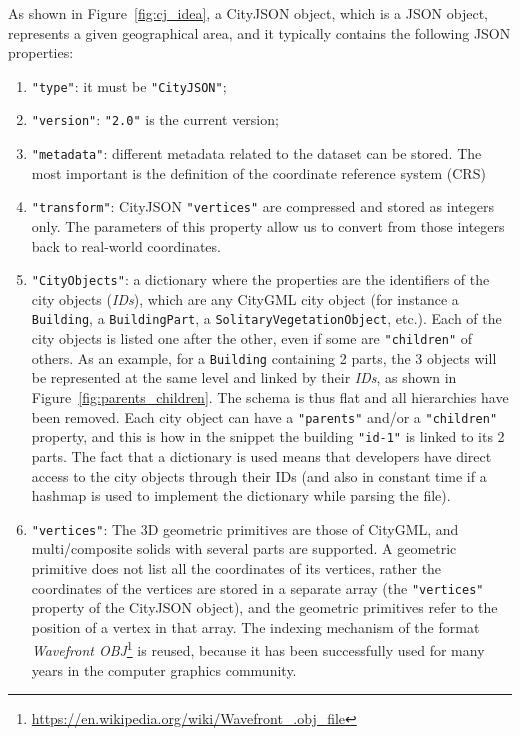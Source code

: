 \documentclass{isprs} %
\begin{document}
As shown in Figure~\ref{fig:cj_idea}, a CityJSON object, which is a JSON object, represents a given geographical area, and it typically contains the following JSON properties: 
\begin{enumerate}
  \item \texttt{"type"}: it must be \texttt{"CityJSON"};
  \item \texttt{"version"}: \texttt{"2.0"} is the current version;
  \item \texttt{"metadata"}: different metadata related to the dataset can be stored. The most important is the definition of the coordinate reference system (CRS)
  \item \texttt{"transform"}: CityJSON \texttt{"vertices"} are compressed and stored as integers only. The parameters of this property allow us to convert from those integers back to real-world coordinates.
  \item \texttt{"CityObjects"}: a dictionary where the properties are the identifiers of the city objects (\emph{IDs}), which are any CityGML city object (for instance a \texttt{Building}, a \texttt{BuildingPart}, a \texttt{SolitaryVegetationObject}, etc.).
  Each of the city objects is listed one after the other, even if some are \texttt{"children"} of others.
  As an example, for a \texttt{Building} containing 2 parts, the 3 objects will be represented at the same level and linked by their \emph{IDs}, as shown in Figure~\ref{fig:parents_children}.
  The schema is thus flat and all hierarchies have been removed.
  Each city object can have a \texttt{"parents"} and/or a \texttt{"children"} property, and this is how in the snippet the building \texttt{"id-1"} is linked to its 2 parts.
  The fact that a dictionary is used means that developers have direct access to the city objects through their IDs (and also in constant time if a hashmap is used to implement the dictionary while parsing the file).
  \item \texttt{"vertices"}: The 3D geometric primitives are those of CityGML, and multi/composite solids with several parts are supported.
  A geometric primitive does not list all the coordinates of its vertices, rather the coordinates of the vertices are stored in a separate array (the \texttt{"vertices"} property of the CityJSON object), and the geometric primitives refer to the position of a vertex in that array.
  The indexing mechanism of the format \emph{Wavefront OBJ}\footnote{\url{https://en.wikipedia.org/wiki/Wavefront_.obj_file}} is reused, because it has been successfully used for many years in the computer graphics community.

\end{enumerate}
\end{document}
